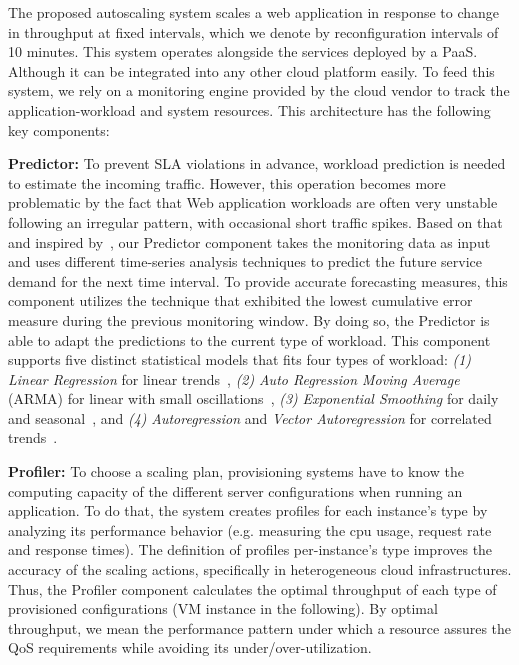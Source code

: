 \label{sec:approach}

The proposed autoscaling system scales a web application in response to change in throughput at fixed intervals, which we denote by reconfiguration intervals of 10 minutes.  This system operates alongside the services deployed by a PaaS. Although it can be integrated into any other cloud platform easily. To feed this system, we rely on a monitoring engine provided by the cloud vendor to track the application-workload and system resources. This architecture has the following key components:



\vspace{2mm}

\textbf{Predictor: } To prevent SLA violations in advance, workload prediction is needed to estimate the incoming traffic. However, this operation becomes more problematic by the fact that Web application workloads are often very unstable following an irregular pattern, with occasional short traffic spikes. Based on that and inspired by~\cite{wolski_network_1999}, our Predictor component takes the monitoring data as input and uses different time-series analysis techniques to predict the future service demand for the next time interval. To provide accurate forecasting measures, this component utilizes the technique that exhibited the lowest cumulative error measure during the previous monitoring window. By doing so, the Predictor is able to adapt the predictions to the current type of workload. This component supports five distinct statistical models that fits four types of workload: \emph{(1)} \emph{Linear Regression} for linear trends~\cite{muppala_regression-based_2012}, \emph{(2)} \emph{Auto Regression Moving Average} (ARMA) for linear with small oscillations~\cite{roy_efficient_2011}, \emph{(3)} \emph{Exponential Smoothing} for daily and seasonal~\cite{exponential_smoothing2010}, and \emph{(4)} \emph{Autoregression} and \emph{Vector Autoregression} for correlated trends~\cite{vector_autoregression_2006,chandra_dynamic_2003}. 


\vspace{2mm}

\textbf{Profiler: } To choose a scaling plan, provisioning systems have to know the computing capacity of the different server configurations when running an application. To do that, the system creates profiles for each instance's type by analyzing its performance behavior (e.g. measuring the cpu usage, request rate and response times).  The definition of profiles per-instance's type improves the accuracy of the scaling actions, specifically in heterogeneous cloud infrastructures. Thus, the Profiler component calculates the optimal throughput of each type of provisioned configurations (VM instance in the following). By optimal throughput, we mean the performance pattern under which a resource assures the QoS requirements while avoiding its under/over-utilization.


